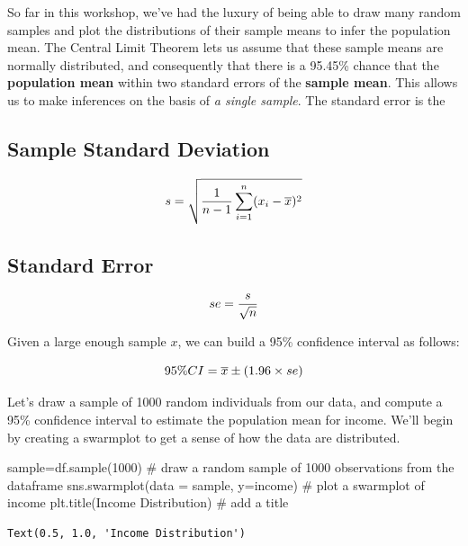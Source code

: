\documentclass[
  letterpaper,
  DIV=11,
  numbers=noendperiod]{scrreprt}
\newenvironment{Shaded}{\begin{snugshade}}{\end{snugshade}}
\newcommand{\CommentTok}[1]{\textcolor[rgb]{0.37,0.37,0.37}{#1}}
\newcommand{\DecValTok}[1]{\textcolor[rgb]{0.68,0.00,0.00}{#1}}
\newcommand{\NormalTok}[1]{\textcolor[rgb]{0.00,0.23,0.31}{#1}}
\newcommand{\OperatorTok}[1]{\textcolor[rgb]{0.37,0.37,0.37}{#1}}
\newcommand{\StringTok}[1]{\textcolor[rgb]{0.13,0.47,0.30}{#1}}
\begin{document}
So far in this workshop, we've had the luxury of being able to draw many
random samples and plot the distributions of their sample means to infer
the population mean. The Central Limit Theorem lets us assume that these
sample means are normally distributed, and consequently that there is a
95.45\% chance that the \textbf{population mean} within two standard
errors of the \textbf{sample mean}. This allows us to make inferences on
the basis of \emph{a single sample}. The standard error is the

\hypertarget{sample-standard-deviation}{%
\subsection{Sample Standard Deviation}\label{sample-standard-deviation}}

\[\huge s = \sqrt{\frac{1}{n-1} \sum_{i=1}^n (x_i - \overline{x})^2}\]

\hypertarget{standard-error}{%
\subsection{Standard Error}\label{standard-error}}

\[\huge se = \frac{s}{\sqrt{n}}\]

Given a large enough sample \(x\), we can build a 95\% confidence
interval as follows:

\[ \huge 95\% CI = \overline{x} \pm (1.96 \times se)\]

Let's draw a sample of 1000 random individuals from our data, and
compute a 95\% confidence interval to estimate the population mean for
income. We'll begin by creating a swarmplot to get a sense of how the
data are distributed.

\begin{Shaded}
\begin{Highlighting}[]
\NormalTok{sample}\OperatorTok{=}\NormalTok{df.sample(}\DecValTok{1000}\NormalTok{) }\CommentTok{\# draw a random sample of 1000 observations from the dataframe}
\NormalTok{sns.swarmplot(data }\OperatorTok{=}\NormalTok{ sample, y}\OperatorTok{=}\StringTok{\textquotesingle{}income\textquotesingle{}}\NormalTok{) }\CommentTok{\# plot a swarmplot of income}
\NormalTok{plt.title(}\StringTok{\textquotesingle{}Income Distribution\textquotesingle{}}\NormalTok{) }\CommentTok{\# add a title}
\end{Highlighting}
\end{Shaded}

\begin{verbatim}
Text(0.5, 1.0, 'Income Distribution')
\end{verbatim}
\end{document}
